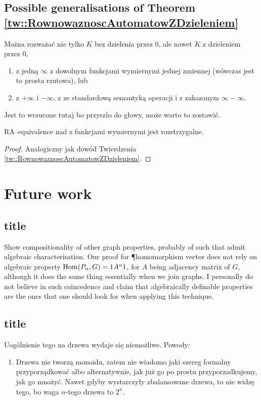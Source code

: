 \subsection{Possible generalisations of Theorem \ref{tw::RownowaznoscAutomatowZDzieleniem}}
Można rozważać nie tylko $K$ bez dzielenia przez 0, ale nawet 
$K$ z dzieleniem przez 0, 
\begin{enumerate}
	\item 
z jedną $\infty$ z dowolnym funkcjami wymiernymi jednej zmiennej (wówczas jest to prosta rzutowa), lub
	\item  \Q z $+\infty$ i $-\infty$, z ze standardową semantyką operacji i z zakazanym $\infty - \infty$. 
\end{enumerate}
Jest to wrzucone tutaj bo przyszło do głowy, może warto to zostawić.
\begin{lm}
	RA--equivalence nad  z funkcjami wymiernymi jest rozstrzygalne.
\end{lm}
\begin{proof}
	Analogiczny jak dowód Twierdzenia \ref{tw::RownowaznoscAutomatowZDzieleniem}.
\end{proof}
\section{Future work}
\subsection{title}
Show compositionality of other graph properties, probably of such that admit algebraic characterisation. Our proof for \P homomorphism vector does not rely on algebraic property $\operatorname{Hom}(P_n, G) = 1A^n1$, for $A$ being adjacency matrix of $G$, although it does the same thing essentially when we join graphs. I personally do not believe in such coincedence and claim that algebraically definable properties are the ones that one should look for when applying this technique.
\subsection{title}
Uogólnienie tego na drzewa wydaje się niemożliwe. Powody:
\begin{enumerate}
	\item Drzewa nie tworzą monoidu, zatem nie wiadomo jaki szereg formalny przyporządkować albo alternatywnie, jak już go po prostu przyporzadkujemy, jak go mnożyć. Nawet gdyby wystarczyły zbalansowane drzewa, to nie widzę tego, bo waga $n$-tego drzewa to $2^n$.
\end{enumerate}
